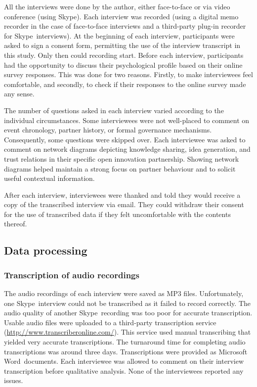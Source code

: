 All the interviews were done by the author, either face-to-face or via video conference (using Skype\texttrademark). Each interview was recorded (using a digital memo recorder in the case of face-to-face interviews and a third-party plug-in recorder for Skype\texttrademark\ interviews). At the beginning of each interview, participants were asked to sign a consent form, permitting the use of the interview transcript in this study. Only then could recording start. Before each interview, participants had the opportunity to discuss their psychological profile based on their online survey responses. This was done for two reasons. Firstly, to make interviewees feel comfortable, and secondly, to check if their responses to the online survey made any sense. \medskip

The number of questions asked in each interview varied according to the individual circumstances. Some interviewees were not well-placed to comment on event chronology, partner history, or formal governance mechanisms. Consequently, some questions were skipped over. Each interviewee was asked to comment on network diagrams depicting knowledge sharing, idea generation, and trust relations in their specific open innovation partnership. Showing network diagrams helped maintain a strong focus on partner behaviour and to solicit useful contextual information. \medskip

After each interview, interviewees were thanked and told they would receive a copy of the transcribed interview via email. They could withdraw their consent for the use of transcribed data if they felt uncomfortable with the contents thereof. 

\subsection{Data processing}

\subsubsection{Transcription of audio recordings}

The audio recordings of each interview were saved as MP3 files. Unfortunately, one Skype\texttrademark\ interview could not be transcribed as it failed to record correctly. The audio quality of another Skype\texttrademark\ recording was too poor for accurate transcription. Usable audio files were uploaded to a third-party transcription service (\url{http://www.transcriberonline.com/}). This service used manual transcribing that yielded very accurate transcriptions. The turnaround time for completing audio transcriptions was around three days. Transcriptions were provided as Microsoft Word\texttrademark\ documents. Each interviewee was allowed to comment on their interview transcription before qualitative analysis. None of the interviewees reported any issues. 

